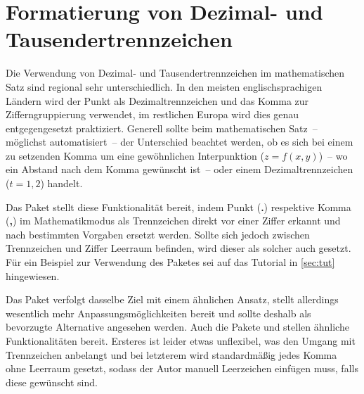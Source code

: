 \section[%
  Das Paket \Package{mathswap} -- Dezimal- und Tausendertrennzeichen%
]{%
  Formatierung von Dezimal- und Tausendertrennzeichen%
}
%
\begin{DeclareEntity}{}
Die Verwendung von Dezimal- und Tausendertrennzeichen im mathematischen Satz 
sind regional sehr unterschiedlich. In den meisten englischsprachigen Ländern 
wird der Punkt als Dezimaltrennzeichen und das Komma zur Zifferngruppierung 
verwendet, im restlichen Europa wird dies genau entgegengesetzt praktiziert.
Generell sollte beim mathematischen Satz~-- möglichst automatisiert~-- der 
Unterschied beachtet werden, ob es sich bei einem zu setzenden Komma um eine 
gewöhnlichen Interpunktion ($z=f(x,y)$)~-- wo ein Abstand nach dem Komma 
gewünscht ist~-- oder einem Dezimaltrennzeichen ($t=1,\!2$) handelt.

Das Paket  stellt diese Funktionalität bereit, indem Punkt 
(\:\textbf{.}\:) respektive Komma (\:\textbf{,}\:) im Mathematikmodus als 
Trennzeichen direkt vor einer Ziffer erkannt und nach bestimmten Vorgaben 
ersetzt werden. Sollte sich jedoch zwischen Trennzeichen und Ziffer Leerraum 
befinden, wird dieser als solcher auch gesetzt. Für ein Beispiel zur Verwendung 
des Paketes sei auf das Tutorial  in \autoref{sec:tut} 
hingewiesen.

Das Paket  verfolgt dasselbe Ziel mit einem ähnlichen 
Ansatz, stellt allerdings wesentlich mehr Anpassungsmöglichkeiten bereit und 
sollte deshalb als bevorzugte Alternative angesehen werden. Auch die Pakete 
 und  stellen ähnliche Funktionalitäten 
bereit. Ersteres ist leider etwas unflexibel, was den Umgang mit Trennzeichen 
anbelangt und bei letzterem wird standardmäßig jedes Komma ohne Leerraum 
gesetzt, sodass der Autor manuell Leerzeichen einfügen muss, falls diese 
gewünscht sind. 


\end{DeclareEntity}
